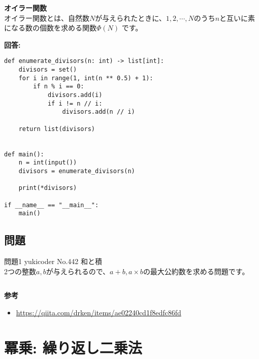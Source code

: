 \newpage
\begin{tcolorbox}[enhanced,
    colback=white!85!gray,
    drop fuzzy shadow,
    boxrule=0.3mm,
    arc=0mm,
    left=0pt,
    top=0pt,
    sharp corners,
    width=\textwidth,
    ]
    \textbf{オイラー関数} \\
    オイラー関数とは、自然数$N$が与えられたときに、$1, 2, \cdots, N$のうち$n$と互いに素になる数の個数を求める関数$\Phi(N)$
    です。
  \tcblower
  
  \begin{tcolorbox}[
    coltext=white!10!blue,
    colback=white!90!purple!90!blue,
    drop fuzzy shadow,
    boxrule=0mm,
    arc=0mm,
    width=1.3cm,
    left=0pt,
    right=0pt,
    top=0pt,
    bottom=0pt,
    halign=flush left,
  ]
  \end{tcolorbox}
  \tcblower
  \textbf{回答:}
  \begin{lstlisting}
def enumerate_divisors(n: int) -> list[int]:
    divisors = set()
    for i in range(1, int(n ** 0.5) + 1):
        if n % i == 0:
            divisors.add(i)
            if i != n // i:
                divisors.add(n // i)
    
    return list(divisors)


def main():
    n = int(input())
    divisors = enumerate_divisors(n)
    
    print(*divisors)
    
if __name__ == "__main__":
    main()

  \end{lstlisting}
  \end{tcolorbox}%

\subsection{問題}

問題1  yukicoder No.442 和と積 \\
2つの整数$a, b$が与えられるので、$a + b, a \times b$の最大公約数を求める問題です。
\begin{lstlisting}[caption=2点間の格子点の個数の実装, label=grid, frame=TRBL]
\end{lstlisting}

\textbf{参考}

\begin{itemize}
    \item \url{https://qiita.com/drken/items/ae02240cd1f8edfc86fd}
\end{itemize}

\section{冪乗: 繰り返し二乗法}

